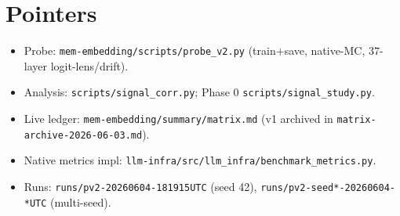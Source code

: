 \documentclass[11pt]{article}
\newcommand{\code}[1]{\texttt{#1}}
\begin{document}
\section*{Pointers}
\begin{itemize}\setlength\itemsep{1pt}
\item Probe: \code{mem-embedding/scripts/probe\_v2.py} (train$+$save,
native-MC, $37$-layer logit-lens/drift).
\item Analysis: \code{scripts/signal\_corr.py}; Phase 0
\code{scripts/signal\_study.py}.
\item Live ledger: \code{mem-embedding/summary/matrix.md} (v1 archived in
\code{matrix-archive-2026-06-03.md}).
\item Native metrics impl: \code{llm-infra/src/llm\_infra/benchmark\_metrics.py}.
\item Runs: \code{runs/pv2-20260604-181915UTC} (seed 42),
\code{runs/pv2-seed*-20260604-*UTC} (multi-seed).
\end{itemize}
\end{document}
